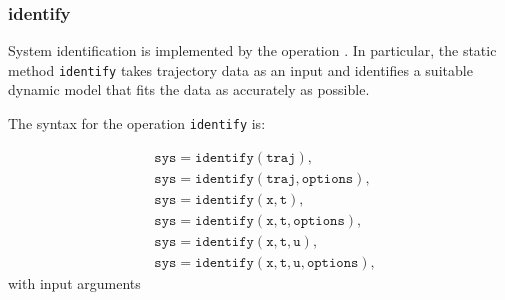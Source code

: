 \subsubsection{identify} \label{sec:identify}

System identification is implemented by the operation .
In particular, the static method \texttt{identify} takes trajectory data as an input and identifies a suitable dynamic model that fits the data as accurately as possible.

The syntax for the operation \texttt{identify} is:

\begin{equation*}
\begin{split}
	& \texttt{sys} = \texttt{identify}(\texttt{traj}), \\
	& \texttt{sys} = \texttt{identify}(\texttt{traj},\texttt{options}), \\
	& \texttt{sys} = \texttt{identify}(\texttt{x},\texttt{t}),\\
	& \texttt{sys} = \texttt{identify}(\texttt{x},\texttt{t},\texttt{options}),\\
	& \texttt{sys} = \texttt{identify}(\texttt{x},\texttt{t},\texttt{u}),\\
	& \texttt{sys} = \texttt{identify}(\texttt{x},\texttt{t},\texttt{u},\texttt{options}),
\end{split}
\end{equation*}
with input arguments

